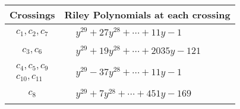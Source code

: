 \documentclass[1p]{elsarticle_modified}
\theoremstyle{definition}
\begin{document}
\begin{tabular}{m{50pt}|m{274pt}}
Crossings & \hspace{64pt}Riley Polynomials at each crossing \\
\hline $$\begin{aligned}c_{1},c_{2},c_{7}\end{aligned}$$&$\begin{aligned}
&y^{29}+27 y^{28}+\cdots+11 y-1
\end{aligned}$\\
\hline $$\begin{aligned}c_{3},c_{6}\end{aligned}$$&$\begin{aligned}
&y^{29}+19 y^{28}+\cdots+2035 y-121
\end{aligned}$\\
\hline $$\begin{aligned}c_{4},c_{5},c_{9}\\c_{10},c_{11}\end{aligned}$$&$\begin{aligned}
&y^{29}-37 y^{28}+\cdots+11 y-1
\end{aligned}$\\
\hline $$\begin{aligned}c_{8}\end{aligned}$$&$\begin{aligned}
&y^{29}+7 y^{28}+\cdots+451 y-169
\end{aligned}$\\
\hline
\end{tabular}
\vskip 2pc
\end{document}
